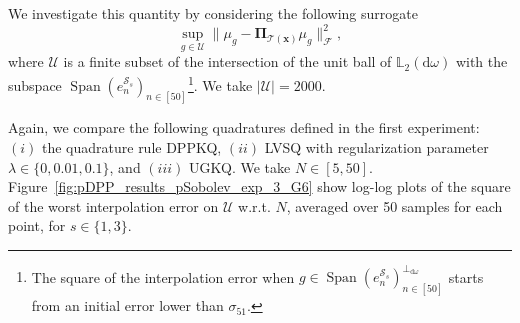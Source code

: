 \documentclass[twoside,11pt]{book}
\numberwithin{theorem}{chapter}
\numberwithin{definition}{chapter}
\numberwithin{proposition}{chapter}
\numberwithin{corollary}{chapter}
\numberwithin{example}{chapter}
\numberwithin{lemma}{chapter}
\numberwithin{assumption}{chapter}
\numberwithin{equation}{chapter}
\numberwithin{figure}{chapter}
\DeclareMathOperator{\Span}{\mathrm{Span}}
\begin{document}
We investigate this quantity by considering the following surrogate
\begin{equation}\label{eq:surrogate_worst_inerpolation_error}
\sup\limits_{g \in \mathcal{U}} \|\mu_{g}-\bm{\Pi}_{\mathcal{T}(\bm{x})} \mu_{g}\|_{\mathcal{F}}^{2},
\end{equation}
where $\mathcal{U}$ is a finite subset of the intersection of the unit ball of $\mathbb{L}_{2}(\mathrm{d}\omega)$ with the subspace $\Span(e_{n}^{\mathcal{S}_{s}})_{n \in [50]}$\footnote{The square of the interpolation error when $g \in \Span(e_{n}^{\mathcal{S}_{s}})_{n \in [50]}^{\perp_{\mathrm{d}\omega}}$ starts from an initial error lower than $\sigma_{51}$.}. We take $|\mathcal{U}| = 2000$.

Again, we compare the following quadratures defined in the first experiment: $(i)$ the quadrature rule DPPKQ, $(ii)$ LVSQ with regularization parameter $\lambda \in \{ 0, 0.01,0.1 \}$, and $(iii)$ UGKQ. We take $N \in [5,50]$. Figure~\ref{fig:pDPP_results_pSobolev_exp_3_G6} show log-log plots of the square of the worst interpolation error on $\mathcal{U}$ w.r.t. $N$, averaged over 50 samples for each point, for $s \in \{1,3\}$.  
\end{document}
